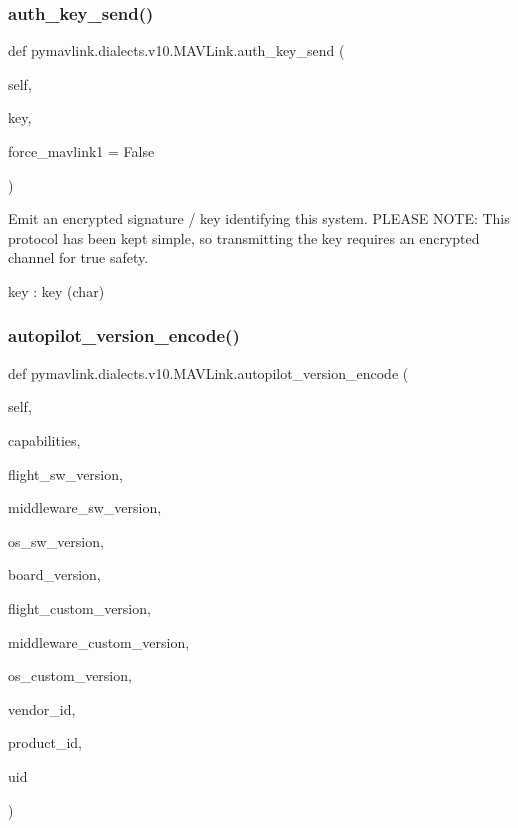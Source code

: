 \subsubsection{\texorpdfstring{auth\+\_\+key\+\_\+send()}{auth\_key\_send()}}
{\footnotesize\ttfamily def pymavlink.\+dialects.\+v10.\+M\+A\+V\+Link.\+auth\+\_\+key\+\_\+send (\begin{DoxyParamCaption}\item[{}]{self,  }\item[{}]{key,  }\item[{}]{force\+\_\+mavlink1 = {\ttfamily False} }\end{DoxyParamCaption})}

\begin{DoxyVerb}Emit an encrypted signature / key identifying this system. PLEASE
NOTE: This protocol has been kept simple, so
transmitting the key requires an encrypted channel for
true safety.

key                       : key (char)\end{DoxyVerb}
 \mbox{\label{classpymavlink_1_1dialects_1_1v10_1_1MAVLink_a8f02f69e3e73c4f1af48910253344ed0}} 
\subsubsection{\texorpdfstring{autopilot\+\_\+version\+\_\+encode()}{autopilot\_version\_encode()}}
{\footnotesize\ttfamily def pymavlink.\+dialects.\+v10.\+M\+A\+V\+Link.\+autopilot\+\_\+version\+\_\+encode (\begin{DoxyParamCaption}\item[{}]{self,  }\item[{}]{capabilities,  }\item[{}]{flight\+\_\+sw\+\_\+version,  }\item[{}]{middleware\+\_\+sw\+\_\+version,  }\item[{}]{os\+\_\+sw\+\_\+version,  }\item[{}]{board\+\_\+version,  }\item[{}]{flight\+\_\+custom\+\_\+version,  }\item[{}]{middleware\+\_\+custom\+\_\+version,  }\item[{}]{os\+\_\+custom\+\_\+version,  }\item[{}]{vendor\+\_\+id,  }\item[{}]{product\+\_\+id,  }\item[{}]{uid }\end{DoxyParamCaption})}

